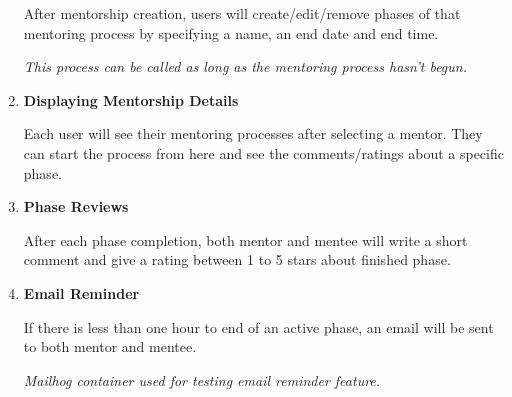 \documentclass[10pt]{article}
\begin{document}
\begin{enumerate}
After mentorship creation, users will create/edit/remove phases of that mentoring process by
specifying a name, an end date and end time.

\textit{This process can be called as long as the mentoring process hasn't begun.}


\item \textbf{Displaying Mentorship Details}

Each user will see their mentoring processes after selecting a mentor. They can start the
process from here and see the comments/ratings about a specific phase.


\item \textbf{Phase Reviews}

After each phase completion, both mentor and mentee will write a short comment and give a
rating between 1 to 5 stars about finished phase.


\item \textbf{Email Reminder}

If there is less than one hour to end of an active phase, an email will be sent to both
mentor and mentee.

\textit{Mailhog container used for testing email reminder feature.}

\end{enumerate}
\end{document}
